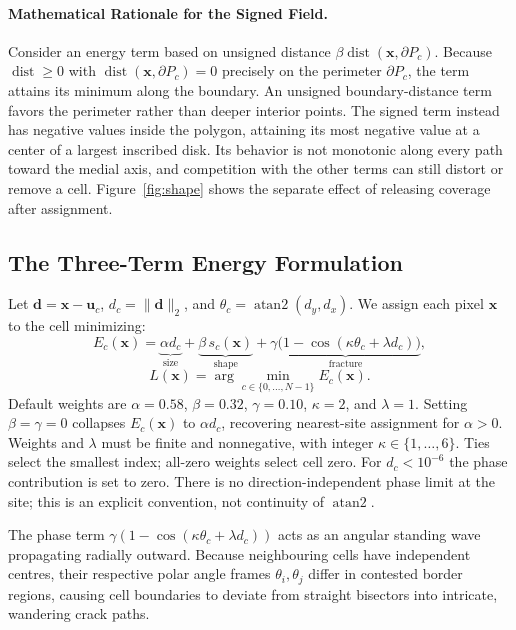 \documentclass[sigconf,nonacm]{acmart}
\begin{document}
\paragraph{Mathematical Rationale for the Signed Field.}
Consider an energy term based on unsigned distance
$\beta \operatorname{dist}(\mathbf{x}, \partial P_c)$. Because
$\operatorname{dist} \ge 0$ with $\operatorname{dist}(\mathbf{x}, \partial P_c) = 0$
precisely on the perimeter $\partial P_c$, the term attains its minimum along the
boundary. An unsigned boundary-distance term favors the perimeter rather than deeper interior points. The signed
term instead has negative values inside the polygon, attaining its most
negative value at a center of a largest inscribed disk. Its behavior is not
monotonic along every path toward the medial axis, and competition with the
other terms can still distort or remove a cell. Figure~\ref{fig:shape} shows
the separate effect of releasing coverage after assignment.

\subsection{The Three-Term Energy Formulation}

Let $\mathbf{d} = \mathbf{x} - \mathbf{u}_c$, $d_c = \lVert\mathbf{d}\rVert_2$,
and $\theta_c = \operatorname{atan2}(d_y, d_x)$. We assign each pixel
$\mathbf{x}$ to the cell minimizing:
\begin{equation}
E_c(\mathbf{x}) = \underbrace{\alpha d_c}_{\text{size}}
+ \underbrace{\beta\,s_c(\mathbf{x})}_{\text{shape}}
+ \underbrace{\gamma\bigl(1-\cos(\kappa\theta_c+\lambda d_c)\bigr)}_{\text{fracture}},
\label{eq:energy}
\end{equation}
\begin{equation}
L(\mathbf{x}) = \arg\min_{c \in \{0,\dots,N-1\}} E_c(\mathbf{x}).
\label{eq:argmin}
\end{equation}
Default weights are $\alpha=0.58$, $\beta=0.32$, $\gamma=0.10$, $\kappa=2$, and
$\lambda=1$. Setting $\beta = \gamma = 0$ collapses $E_c(\mathbf{x})$ to
$\alpha d_c$, recovering nearest-site assignment for $\alpha>0$.
Weights and $\lambda$ must be finite and nonnegative, with integer
$\kappa\in\{1,\ldots,6\}$. Ties select the smallest index; all-zero weights
select cell zero. For $d_c<10^{-6}$ the phase contribution is set to zero.
There is no direction-independent phase limit at the site; this is an explicit
convention, not continuity of $\operatorname{atan2}$.

The phase term $\gamma(1 - \cos(\kappa\theta_c + \lambda d_c))$ acts as an
angular standing wave propagating radially outward. Because neighbouring cells
have independent centres, their respective polar angle frames $\theta_i, \theta_j$
differ in contested border regions, causing cell boundaries to
deviate from straight bisectors into intricate, wandering crack paths.
\end{document}
